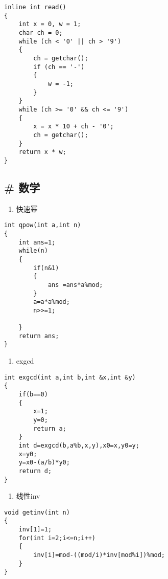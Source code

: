 \documentclass[]{article}
\providecommand{\tightlist}{%
  \setlength{\itemsep}{0pt}\setlength{\parskip}{0pt}}
\begin{document}
\begin{verbatim}
inline int read()
{
    int x = 0, w = 1;
    char ch = 0;
    while (ch < '0' || ch > '9')
    {
        ch = getchar();
        if (ch == '-')
        {
            w = -1;
        }
    }
    while (ch >= '0' && ch <= '9')
    {
        x = x * 10 + ch - '0';
        ch = getchar();
    }
    return x * w;
}
\end{verbatim}

\hypertarget{ux6570ux5b66}{%
\subsection{\# 数学}\label{ux6570ux5b66}}

\begin{enumerate}
\def\labelenumi{\arabic{enumi}.}
\tightlist
\item
  快速幂
\end{enumerate}

\begin{verbatim}
int qpow(int a,int n)
{
    int ans=1;
    while(n)
    {
        if(n&1)
        {
            ans =ans*a%mod;
        }
        a=a*a%mod;
        n>>=1;

    }
    return ans;
}
\end{verbatim}

\begin{enumerate}
\def\labelenumi{\arabic{enumi}.}
\setcounter{enumi}{1}
\tightlist
\item
  exgcd
\end{enumerate}

\begin{verbatim}
int exgcd(int a,int b,int &x,int &y)
{
    if(b==0)
    {
        x=1;
        y=0;
        return a;
    }
    int d=exgcd(b,a%b,x,y),x0=x,y0=y;
    x=y0;
    y=x0-(a/b)*y0;
    return d;
}
\end{verbatim}

\begin{enumerate}
\def\labelenumi{\arabic{enumi}.}
\setcounter{enumi}{2}
\tightlist
\item
  线性inv
\end{enumerate}

\begin{verbatim}
void getinv(int n)
{
    inv[1]=1;
    for(int i=2;i<=n;i++)
    {
        inv[i]=mod-((mod/i)*inv[mod%i])%mod;
    }
}
\end{verbatim}
\end{document}
